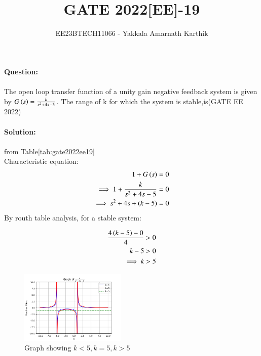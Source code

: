 \documentclass[journal,12pt,twocolumn]{IEEEtran}
\begin{document}


\title{GATE 2022[EE]-19}
\author{EE23BTECH11066 - Yakkala Amarnath Karthik}
\maketitle


\textbf{Question:}\\ \\
The open loop transfer function of a unity gain negative feedback system is given by $G\left(s\right)= \frac{k}{s^2 +4s-5}$. The range of k for which the system is stable,is\hfill(GATE EE 2022)\\ \\

\textbf{Solution:}\\ 
\\
 from Table\ref{tab:gate2022ee19}\\
Characteristic equation:
\begin{align}
    1+G\left(s\right)=0\\
    \implies 1+\frac{k}{s^2 +4s-5}=0\\
    \implies s^2+4s+\left(k-5\right)=0
\end{align}
By routh table analysis, for a stable system:


\begin{align}
\frac{4\left(k-5\right)-0}{4}>0\\
    k-5>0\\
    \implies k>5
\end{align}

\begin{figure}[ht]
    \centering
    \includegraphics[width=0.45\textwidth]{figs/gate2022.png}
    \caption{Graph showing $k<5,k=5,k>5$}
\end{figure}
\end{document}
